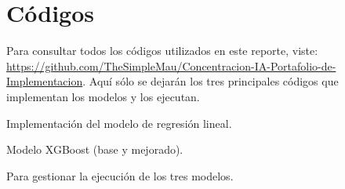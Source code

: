 \documentclass[a4paper,12pt,twocolumn]{report}
\begin{document}
\chapter{Códigos}

Para consultar todos los códigos utilizados en este reporte, viste: \url{https://github.com/TheSimpleMau/Concentracion-IA-Portafolio-de-Implementacion}.
Aquí sólo se dejarán los tres principales códigos que implementan los modelos y los ejecutan.

Implementación del modelo de regresión lineal.


\newpage
Modelo XGBoost (base y mejorado).


\newpage
Para gestionar la ejecución de los tres modelos.

\end{document}
